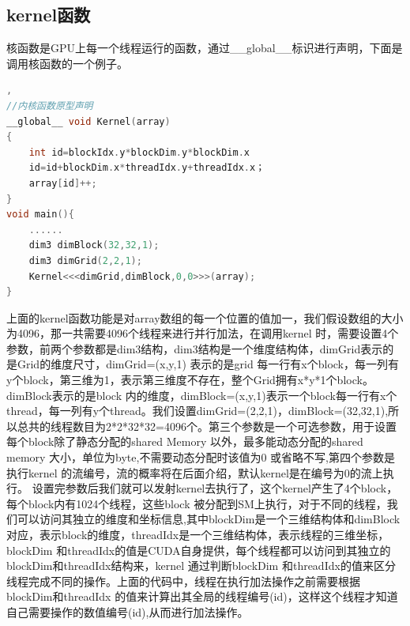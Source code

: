 \subsection{kernel函数}
核函数是GPU上每一个线程运行的函数，通过\_\_global\_\_标识进行声明，下面是调用核函数的一个例子。
\begin{lstlisting}[language=C],
//内核函数原型声明
__global__ void Kernel(array)
{
    int id=blockIdx.y*blockDim.y*blockDim.x
    id=id+blockDim.x*threadIdx.y+threadIdx.x；
    array[id]++;
}
void main(){
    ......
    dim3 dimBlock(32,32,1);
    dim3 dimGrid(2,2,1);
    Kernel<<<dimGrid,dimBlock,0,0>>>(array);
}
\end{lstlisting}
上面的kernel函数功能是对array数组的每一个位置的值加一，我们假设数组的大小为4096，那一共需要4096个线程来进行并行加法，在调用kernel 时，需要设置4个参数，前两个参数都是dim3结构，dim3结构是一个维度结构体，dimGrid表示的是Grid的维度尺寸，dimGrid=(x,y,1) 表示的是grid 每一行有x个block，每一列有y个block，第三维为1，表示第三维度不存在，整个Grid拥有x*y*1个block。dimBlock表示的是block 内的维度，dimBlock=(x,y,1)表示一个block每一行有x个thread，每一列有y个thread。我们设置dimGrid=(2,2,1)，dimBlock=(32,32,1),所以总共的线程数目为2*2*32*32=4096个。第三个参数是一个可选参数，用于设置每个block除了静态分配的shared Memory 以外，最多能动态分配的shared memory 大小，单位为byte,不需要动态分配时该值为0 或省略不写,第四个参数是执行kernel 的流编号，流的概率将在后面介绍，默认kernel是在编号为0的流上执行。\newline
设置完参数后我们就可以发射kernel去执行了，这个kernel产生了4个block，每个block内有1024个线程，这些block 被分配到SM上执行，对于不同的线程，我们可以访问其独立的维度和坐标信息,其中blockDim是一个三维结构体和dimBlock对应，表示block的维度，threadIdx是一个三维结构体，表示线程的三维坐标，blockDim 和threadIdx的值是CUDA自身提供，每个线程都可以访问到其独立的blockDim和threadIdx结构来，kernel 通过判断blockDim 和threadIdx的值来区分线程完成不同的操作。上面的代码中，线程在执行加法操作之前需要根据blockDim和threadIdx 的值来计算出其全局的线程编号(id)，这样这个线程才知道自己需要操作的数值编号(id),从而进行加法操作。\newline
